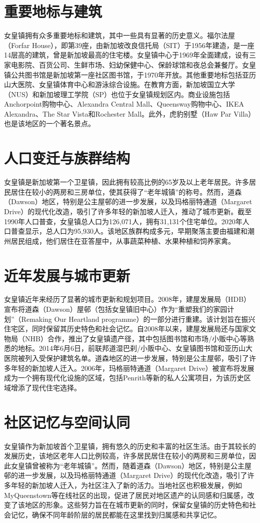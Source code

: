 \documentclass[11pt,a4paper,twoside,openany]{book}
\begin{document}
\section{重要地标与建筑}
女皇镇拥有众多重要地标和建筑，其中一些具有显著的历史意义。福尔法屋（Forfar House），即第39座，由新加坡改良信托局（SIT）于1956年建造，是一座14层高的建筑，曾是新加坡最高的住宅楼。女皇镇中心于1969年全面建成，设有三家电影院、百货公司、生鲜市场、妇幼保健中心、保龄球馆和夜总会兼餐厅。女皇镇公共图书馆是新加坡第一座社区图书馆，于1970年开放。其他重要地标包括亚历山大医院、女皇镇体育中心和游泳综合设施。在教育方面，新加坡国立大学（NUS）和新加坡理工学院（SP）也位于女皇镇规划区内。商业设施包括Anchorpoint购物中心、Alexandra Central Mall、Queensway购物中心、IKEA Alexandra、The Star Vista和Rochester Mall。此外，虎豹别墅（Haw Par Villa）也是该地区的一个著名景点。

\section{人口变迁与族群结构}
女皇镇是新加坡第一个卫星镇，因此拥有较高比例的65岁及以上老年居民。许多居民居住在较小的两房和三房单位，使其获得了“老年城镇”的称号。然而，道森（Dawson）地区，特别是公主屋邨的进一步发展，以及玛格丽特通道（Margaret Drive）的现代化改造，吸引了许多年轻的新加坡人迁入，推动了城市更新。截至1990年人口普查，女皇镇总人口为126,071人，拥有31,131个住宅单位。2020年人口普查显示，总人口为95,930人。该地区族群构成多元，早期聚落主要由福建和潮州居民组成，他们居住在亚答屋中，从事蔬菜种植、水果种植和饲养家禽。

\section{近年发展与城市更新}
女皇镇近年来经历了显著的城市更新和规划项目。2008年，建屋发展局（HDB）宣布将道森（Dawson）屋邨（包括女皇镇旧中心）作为“重塑我们的家园计划”（Remaking Our Heartland programme）的一部分进行重建。该计划旨在振兴住宅区，同时保留其历史特色和社会记忆。自2008年以来，建屋发展局还与国家文物局（NHB）合作，推出了女皇镇遗产径，其中包括图书馆和市场/小贩中心等熟悉的地标。2014年6月6日，前联邦道湿巴刹/小贩中心、女皇镇图书馆和亚历山大医院被列入受保护建筑名单。道森地区的进一步发展，特别是公主屋邨，吸引了许多年轻的新加坡人迁入。2006年，玛格丽特通道（Margaret Drive）被宣布将发展成为一个拥有现代化设施的区域，包括Penrith等新的私人公寓项目，为该历史区域增添了现代住宅选择。

\section{社区记忆与空间认同}
女皇镇作为新加坡首个卫星镇，拥有悠久的历史和丰富的社区生活。由于其较长的发展历史，该地区老年人口比例较高，许多居民居住在较小的两房和三房单位，因此女皇镇曾被称为“老年城镇”。然而，随着道森（Dawson）地区，特别是公主屋邨的进一步发展，以及玛格丽特通道（Margaret Drive）的现代化改造，吸引了许多年轻的新加坡人迁入，为社区注入了新的活力。当地社区也积极发展，例如MyQueenstown等在线社区的出现，促进了居民对地区遗产的认同感和归属感，改变了该地区的形象。这些努力旨在在城市更新的同时，保留女皇镇的历史特色和社会记忆，确保不同年龄阶层的居民都能在这里找到归属感和共享记忆。
\end{document}
